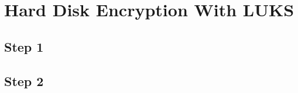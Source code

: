 \documentclass[../xdudla00-porting-Tang-to-Open-WRT.tex]{subfiles}
\begin{document}
\chapter{Hard Disk Encryption With LUKS}

\section{Step 1}

\section{Step 2}
\end{document}
